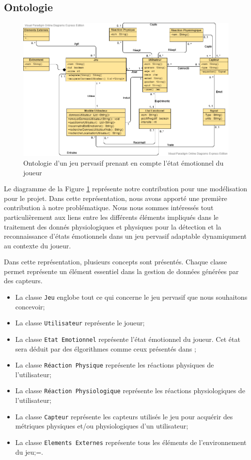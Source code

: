 \documentclass[11pt]{article}
\begin{document}
	\subsection{Ontologie}\label{sec:ontologie}
		\begin{figure}[t]
			\centering
			\includegraphics[scale=0.5]{../include/ontologie_stage_cnam-v2-5.png}
			\caption{Ontologie d'un jeu pervasif prenant en compte l'état émotionnel du joueur}
			\label{fig:modele}
		\end{figure}
		Le diagramme de la Figure \ref{fig:modele} représente notre contribution pour une modélisation pour le projet.
		Dans cette représentation, nous avons apporté une première contribution à notre problématique.
		Nous nous sommes intéressés tout particulièrement aux liens entre les différents éléments impliqués dans le traitement des donnés physiologiques et physiques pour la détection et la reconnaissance d'états émotionnels dans un jeu pervasif adaptable dynamiqument au contexte du joueur.\par
		Dans cette représentation, plusieurs concepts sont présentés.
		Chaque classe permet représente un élément essentiel dans la gestion de données générées par des capteurs.
		\begin{itemize}
			\item La classe \texttt{Jeu} englobe tout ce qui concerne le jeu pervasif que nous souhaitons concevoir;
			\item La classe \texttt{Utilisateur} représente le joueur;
			\item La classe \texttt{Etat Emotionnel} représente l'état émotionnel du joueur. Cet état sera déduit par des élgorithmes comme ceux présentés dans \cite{gal_2019, gal_et_al._2020};
			\item La classe \texttt{Réaction Physique} représente les réactions physiques de l'utilisateur;
			\item La classe \texttt{Réaction Physiologique} représente les réactions physiologiques de l'utilisateur;
			\item La classe \texttt{Capteur} représente les capteurs utilisés le jeu pour acquérir des métriques physiques et/ou physiologiques d'un utilisateur;
			\item La classe \texttt{Elements Externes} représente tous les éléments de l'environnement du jeu;=.
		\end{itemize}\par
\end{document}
